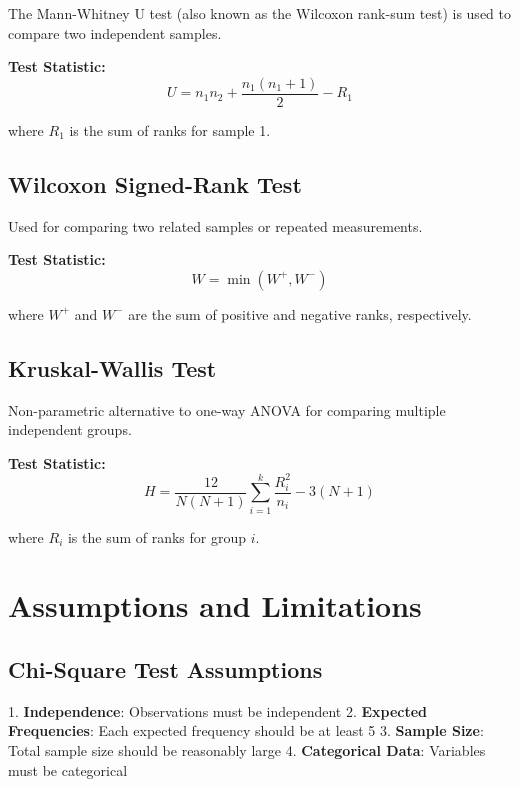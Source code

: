 \documentclass[twoside]{book}
\begin{document}
The Mann-Whitney U test (also known as the Wilcoxon rank-sum test) is used to compare two independent samples.

\textbf{Test Statistic:}
\begin{equation}
U = n_1 n_2 + \frac{n_1(n_1+1)}{2} - R_1
\end{equation}

where $R_1$ is the sum of ranks for sample 1.

\subsection{Wilcoxon Signed-Rank Test}

Used for comparing two related samples or repeated measurements.

\textbf{Test Statistic:}
\begin{equation}
W = \min(W^+, W^-)
\end{equation}

where $W^+$ and $W^-$ are the sum of positive and negative ranks, respectively.

\subsection{Kruskal-Wallis Test}

Non-parametric alternative to one-way ANOVA for comparing multiple independent groups.

\textbf{Test Statistic:}
\begin{equation}
H = \frac{12}{N(N+1)} \sum_{i=1}^{k} \frac{R_i^2}{n_i} - 3(N+1)
\end{equation}

where $R_i$ is the sum of ranks for group $i$.

\section{Assumptions and Limitations}

\subsection{Chi-Square Test Assumptions}

1. \textbf{Independence}: Observations must be independent
2. \textbf{Expected Frequencies}: Each expected frequency should be at least 5
3. \textbf{Sample Size}: Total sample size should be reasonably large
4. \textbf{Categorical Data}: Variables must be categorical
\end{document}
